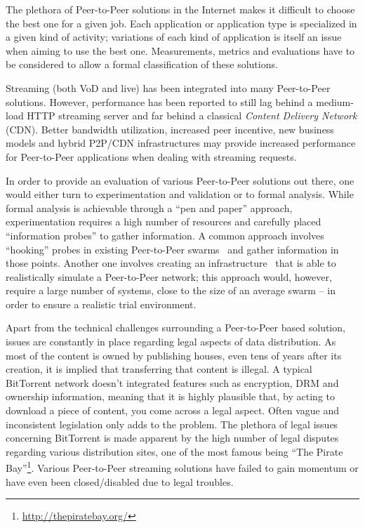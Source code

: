 The plethora of Peer-to-Peer solutions in the Internet makes it difficult to
choose the best one for a given job. Each application or application type is
specialized in a given kind of activity; variations of each kind of
application is itself an issue when aiming to use the best one. Measurements,
metrics and evaluations have to be considered to allow a formal classification
of these solutions.

Streaming (both VoD and live) has been integrated into many Peer-to-Peer
solutions.  However, performance has been reported to still lag behind a
medium-load HTTP streaming server and far behind a classical \textit{Content
Delivery Network} (CDN). Better bandwidth utilization, increased peer
incentive, new business models and hybrid P2P/CDN infrastructures may provide
increased performance for Peer-to-Peer applications when dealing with
streaming requests.

In order to provide an evaluation of various Peer-to-Peer solutions out there,
one would either turn to experimentation and validation or to formal
analysis. While formal analysis is achievable through a ``pen and paper''
approach, experimentation requires a high number of resources and carefully
placed ``information probes'' to gather information. A common approach
involves ``hooking'' probes in existing Peer-to-Peer
swarms~\cite{corr-overlay} and gather
information in those points. Another one involves creating an
infrastructure~\cite{bt-vi}
that is able to realistically simulate a Peer-to-Peer network; this approach
would, however, require a large number of systems, close to the size of an
average swarm -- in order to ensure a realistic trial environment.

Apart from the technical challenges surrounding a Peer-to-Peer based solution,
issues are constantly in place regarding legal aspects of data distribution.
As most of the content is owned by publishing houses, even tens of years after
its creation, it is implied that transferring that content is illegal. A
typical BitTorrent network doesn't integrated features such as encryption, DRM
and ownership information, meaning that it is highly plausible that, by acting
to download a piece of content, you come across a legal aspect. Often vague
and inconsistent legislation only adds to the problem. The plethora of legal
issues concerning BitTorrent is made apparent by the high number of legal
disputes regarding various distribution sites, one of the most famous being
``The Pirate Bay''\footnote{\url{http://thepiratebay.org/}}. Various Peer-to-Peer
streaming solutions have failed to gain momentum or have even been
closed/disabled due to legal troubles.

